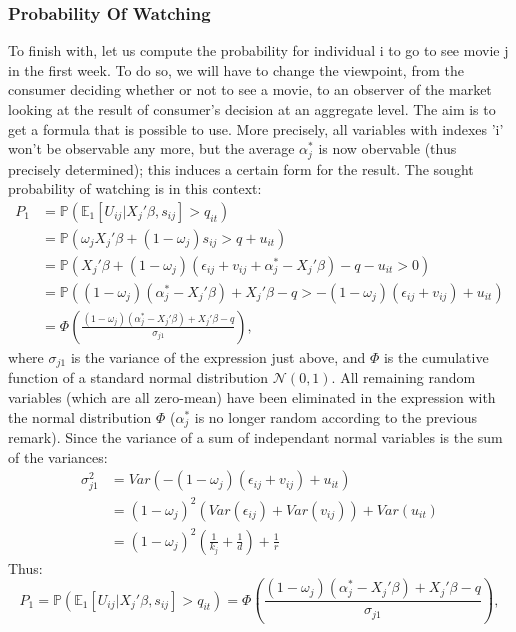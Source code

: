 	\subsubsection{Probability Of Watching}
	To finish with, let us compute the probability for individual i to go to see movie j in the first week. To do so, we will have to change the viewpoint, from the consumer deciding whether or not to see a movie, to an observer of the market looking at the result of consumer's decision at an aggregate level. The aim is to get a formula that is possible to use. More precisely, all variables with indexes 'i' won't be observable any more, but the average $\alpha_{j}^{*}$ is now obervable (thus precisely determined); this induces a certain form for the result. The sought probability of watching is in this context:
	\begin{align*}
	P_{1}&=\mathbb{P}(\mathbb{E}_1[U_{i j}|X_{j}'\beta, s_{i j}]>q_{i t})\\
	&=\mathbb{P}(\omega_{j} X_{j}'\beta+(1-\omega_{j})s_{i j}>q+u_{i t})\\
	&=\mathbb{P}(X_{j}'\beta+(1-\omega_{j})(\epsilon_{i j}+v_{i j}+\alpha_{j}^{*}-X_{j}'\beta)-q-u_{i t}>0)\\
	&=\mathbb{P}((1-\omega_{j})(\alpha_{j}^{*}-X_{j}'\beta)+X_{j}'\beta-q>-(1-\omega_{j})(\epsilon_{i j}+v_{i j})+u_{i t})\\
	&=\Phi\left(\frac{(1-\omega_{j})(\alpha_{j}^{*}-X_{j}'\beta)+X_{j}'\beta-q}{\sigma_{j 1}}\right),
	\end{align*}
	where $\sigma_{j 1}$ is the variance of the expression just above, and $\Phi$ is the cumulative function of a standard normal distribution $\mathcal{N}(0,1)$. All remaining random variables (which are all zero-mean) have been eliminated in the expression with the normal distribution $\Phi$ ($\alpha_{j}^{*}$ is no longer random according to the previous remark). Since the variance of a sum of independant normal variables is the sum of the variances: 
	\begin{align*}
	\sigma_{j 1}^{2}
	&=Var(-(1-\omega_{j})(\epsilon_{i j}+v_{i j})+u_{i t})\\
	&=(1-\omega_{j})^{2}(Var(\epsilon_{i j})+Var(v_{i j}))+Var(u_{i t})\\
	&=(1-\omega_{j})^{2}\left(\frac{1}{k_{j}}+\frac{1}{d}\right)+\frac{1}{r}
	\end{align*}
	Thus:
	\begin{equation} \label{eq:4}
	P_{1}=\mathbb{P}(\mathbb{E}_1[U_{i j}|X_{j}'\beta, s_{i j}]>q_{i t})=\Phi\left(\frac{(1-\omega_{j})(\alpha_{j}^{*}-X_{j}'\beta)+X_{j}'\beta-q}{\sigma_{j 1}}\right),
	\end{equation}
